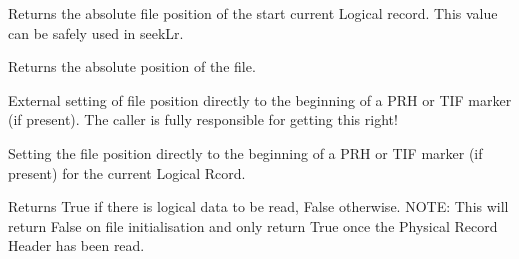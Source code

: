\documentclass[letterpaper,10pt,english]{sphinxmanual}
\begin{document}
\begin{fulllineitems}
\begin{fulllineitems}
\end{fulllineitems}


\begin{fulllineitems}
\label{\detokenize{ref/LIS/core/PhysRec:TotalDepth.LIS.core.PhysRec.PhysRecRead.tellLr}}
Returns the absolute file position of the start current Logical
record. This value can be safely used in seekLr.

\end{fulllineitems}


\begin{fulllineitems}
\label{\detokenize{ref/LIS/core/PhysRec:TotalDepth.LIS.core.PhysRec.PhysRecRead.tell}}
Returns the absolute position of the file.

\end{fulllineitems}


\begin{fulllineitems}
\label{\detokenize{ref/LIS/core/PhysRec:TotalDepth.LIS.core.PhysRec.PhysRecRead.seekLr}}
External setting of file position directly to the beginning of
a PRH or TIF marker (if present). The caller is fully responsible
for getting this right!

\end{fulllineitems}


\begin{fulllineitems}
\label{\detokenize{ref/LIS/core/PhysRec:TotalDepth.LIS.core.PhysRec.PhysRecRead.seekCurrentLrStart}}
Setting the file position directly to the beginning of
a PRH or TIF marker (if present) for the current Logical Rcord.

\end{fulllineitems}


\begin{fulllineitems}
\label{\detokenize{ref/LIS/core/PhysRec:TotalDepth.LIS.core.PhysRec.PhysRecRead.hasLd}}
Returns True if there is logical data to be read, False otherwise.
NOTE: This will return False on file initialisation and only return
True once the Physical Record Header has been read.


\end{fulllineitems}
\end{fulllineitems}
\end{document}
